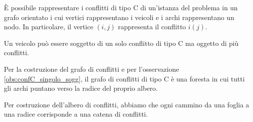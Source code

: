 \documentclass[../../../relazione.tex]{subfiles}
\begin{document}
È possibile rappresentare i conflitti di tipo C di un'istanza del problema in un grafo orientato i cui vertici rappresentano i veicoli e i archi rappresentano un nodo.
In particolare, il vertice $(i, j)$ rappresenta il conflitto $i(j)$.

\begin{observation}\label{obs:confC_singolo_sogg}
  Un veicolo può essere soggetto di un solo conflitto di tipo C ma oggetto di più conflitti.
\end{observation}

\begin{observation}\label{obs:grafo_albero}
  Per la costruzione del grafo di conflitti e per l'osservazione \ref{obs:confC_singolo_sogg}, il grafo di conflitti di tipo C è una foresta in cui tutti gli archi puntano verso la radice del proprio albero.
\end{observation}

\begin{proposition}\label{prop:eq_catena_foglia}
  Per costruzione dell'albero di conflitti, abbiamo che ogni cammino da una foglia a una radice corrisponde a una catena di conflitti.
\end{proposition}
\end{document}
